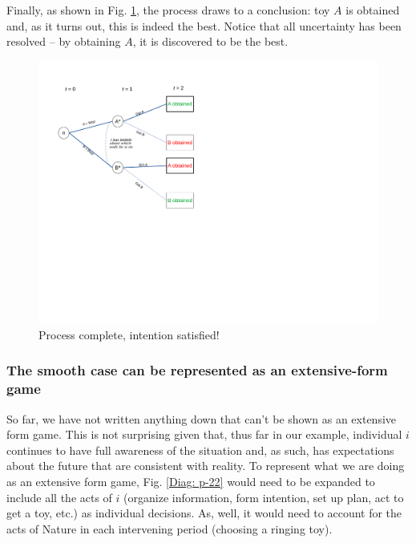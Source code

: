 \documentclass[
11pt,
titlepage,
reqno,
]{article}%
\theoremstyle{definition}
\begin{document}
Finally, as shown in Fig. \ref{Diag: p-21}, the process draws to a conclusion: toy $A$ is obtained and, as it turns out, this is indeed the best. Notice that all uncertainty has been resolved -- by obtaining $A$, it is discovered to be the best.

\begin{figure}[h!]
	\centering
	\includegraphics*[page=21,trim = 0in 5in 0in 0in,scale=.6]{Awareness_Diagrams_All}
	\caption{Process complete, intention satisfied!\label{Diag: p-21}}%
\end{figure}


\subsubsection{The smooth case can be represented as an extensive-form game}

So far, we have not written anything down that can't be shown as an extensive form game. This is not surprising given that, thus far in our example, individual $i$ continues to have full awareness of the situation and, as such, has expectations about the future that are consistent with reality. To represent what we are doing as an extensive form game, Fig. \ref{Diag: p-22} would need to be expanded to include all the acts of $i$ (organize information, form intention, set up plan,  act to get a toy, etc.) as individual decisions. As, well, it would need to account for the acts of Nature in each intervening period (choosing a ringing toy). 
\end{document}
